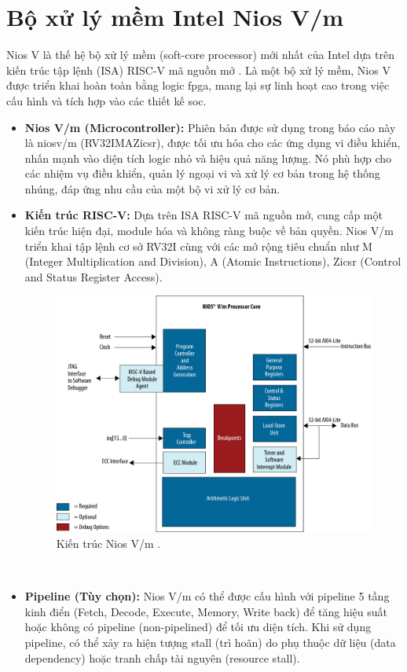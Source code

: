 \section{Bộ xử lý mềm Intel Nios V/m}
Nios V là thế hệ bộ xử lý mềm (soft-core processor) mới nhất của Intel dựa trên kiến trúc tập lệnh (ISA) RISC-V mã nguồn mở \cite{intelNiosVHandbook}. Là một bộ xử lý mềm, Nios V được triển khai hoàn toàn bằng logic \acrshort{fpga}, mang lại sự linh hoạt cao trong việc cấu hình và tích hợp vào các thiết kế \acrshort{soc}.
\begin{itemize}
    \item \textbf{Nios V/m (Microcontroller):} Phiên bản được sử dụng trong báo cáo này là \acrshort{niosv}/m (RV32IMAZicsr), được tối ưu hóa cho các ứng dụng vi điều khiển, nhấn mạnh vào diện tích logic nhỏ và hiệu quả năng lượng. Nó phù hợp cho các nhiệm vụ điều khiển, quản lý ngoại vi và xử lý cơ bản trong hệ thống nhúng, đáp ứng nhu cầu của một bộ vi xử lý cơ bản.
    \item \textbf{Kiến trúc RISC-V:} Dựa trên ISA RISC-V mã nguồn mở, cung cấp một kiến trúc hiện đại, module hóa và không ràng buộc về bản quyền. Nios V/m triển khai tập lệnh cơ sở RV32I cùng với các mở rộng tiêu chuẩn như M (Integer Multiplication and Division), A (Atomic Instructions), Zicsr (Control and Status Register Access).
    \begin{figure}[htbp]
        \centering
        \includegraphics[width=0.6\linewidth]{Images/02_00_NiosVm_Architecture.pdf}
        \caption{Kiến trúc Nios V/m \cite{niosv_architecture}.}
        \label{fig:niosv_architecture}
    \end{figure}
    \item \textbf{Pipeline (Tùy chọn):} Nios V/m có thể được cấu hình với pipeline 5 tầng kinh điển (Fetch, Decode, Execute, Memory, Write back) để tăng hiệu suất hoặc không có pipeline (non-pipelined) để tối ưu diện tích. Khi sử dụng pipeline, có thể xảy ra hiện tượng stall (trì hoãn) do phụ thuộc dữ liệu (data dependency) hoặc tranh chấp tài nguyên (resource stall).
\end{itemize}

